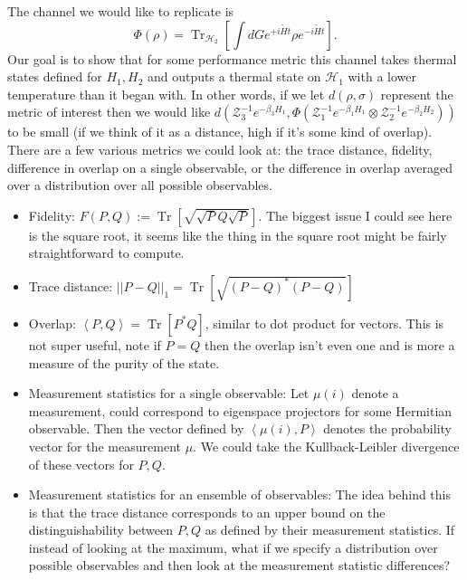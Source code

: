 \documentclass{article}
\newcommand{\parens}[1]{\left( #1 \right)}
\newcommand{\brackets}[1]{\left[ #1 \right]}
\newcommand{\norm}[1]{\left| \left| #1 \right| \right|}
\newcommand{\anglebrackets}[1]{\left< #1 \right>}
\newcommand{\overlap}[2]{\anglebrackets{#1 , #2 }}
\DeclareMathOperator{\Tr}{Tr}
\newcommand{\trace}[1]{\Tr \brackets{ #1 }}
\newcommand{\partrace}[2]{\Tr_{#1} \brackets{ #2 }}
\newcommand{\hilb}{\mathscr{H}}
\newcommand{\partfun}{\mathcal{Z}}
\begin{document}
The channel we would like to replicate is
\begin{equation}
    \Phi(\rho) = \partrace{\hilb_2}{\int dG e^{+i \widetilde{H} t} \rho e^{- i \widetilde{H} t}}.
\end{equation}
Our goal is to show that for some performance metric this channel takes thermal states defined for $H_1, H_2$ and outputs a thermal state on $\hilb_1$ with a lower temperature than it began with. In other words, if we let $d(\rho, \sigma)$ represent the metric of interest then we would like $d \parens{ \partfun_3^{-1} e^{-\beta_3 H_1}, \Phi\parens{\partfun_1^{-1} e^{-\beta_1 H_1} \otimes \partfun_2^{-1}e^{-\beta_2 H_2}} }$ to be small (if we think of it as a distance, high if it's some kind of overlap). There are a few various metrics we could look at: the trace distance, fidelity, difference in overlap on a single observable, or the difference in overlap averaged over a distribution over all possible observables. 

\begin{itemize}
    \item Fidelity: $F(P, Q) := \trace{\sqrt{\sqrt{P} Q \sqrt{P}}}$. The biggest issue I could see here is the square root, it seems like the thing in the square root might be fairly straightforward to compute. 
    \item Trace distance: $\norm{P - Q}_1 = \trace{\sqrt{(P-Q)^*(P-Q)}}$
    \item Overlap: $\anglebrackets{P, Q} = \trace{P^* Q}$, similar to dot product for vectors. This is not super useful, note if $P = Q$ then the overlap isn't even one and is more a measure of the purity of the state. 
    \item Measurement statistics for a single observable: Let $\mu(i)$ denote a measurement, could correspond to eigenspace projectors for some Hermitian observable. Then the vector defined by $\overlap{\mu(i)}{P}$ denotes the probability vector for the measurement $\mu$. We could take the Kullback-Leibler divergence of these vectors for $P, Q$.
    \item Measurement statistics for an ensemble of observables: The idea behind this is that the trace distance corresponds to an upper bound on the distinguishability between $P,Q$ as defined by their measurement statistics. If instead of looking at the maximum, what if we specify a distribution over possible observables and then look at the measurement statistic differences? 
\end{itemize}
\end{document}
